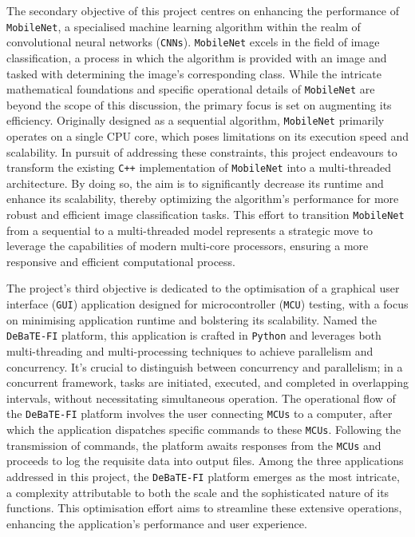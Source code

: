 \documentclass[12pt]{article}
\begin{document}
The secondary objective of this project centres on enhancing the performance of \texttt{MobileNet}, a specialised machine learning algorithm within the realm of convolutional neural networks (\texttt{CNNs}). \texttt{MobileNet} excels in the field of image classification, a process in which the algorithm is provided with an image and tasked with determining the image's corresponding class. While the intricate mathematical foundations and specific operational details of \texttt{MobileNet} are beyond the scope of this discussion, the primary focus is set on augmenting its efficiency. Originally designed as a sequential algorithm, \texttt{MobileNet} primarily operates on a single CPU core, which poses limitations on its execution speed and scalability. In pursuit of addressing these constraints, this project endeavours to transform the existing \texttt{C++} implementation of \texttt{MobileNet} into a multi-threaded architecture. By doing so, the aim is to significantly decrease its runtime and enhance its scalability, thereby optimizing the algorithm's performance for more robust and efficient image classification tasks. This effort to transition \texttt{MobileNet} from a sequential to a multi-threaded model represents a strategic move to leverage the capabilities of modern multi-core processors, ensuring a more responsive and efficient computational process.

The project's third objective is dedicated to the optimisation of a graphical user interface (\texttt{GUI}) application designed for microcontroller (\texttt{MCU}) testing, with a focus on minimising application runtime and bolstering its scalability. Named the \texttt{DeBaTE-FI} platform, this application is crafted in \texttt{Python} and leverages both multi-threading and multi-processing techniques to achieve parallelism and concurrency. It's crucial to distinguish between concurrency and parallelism; in a concurrent framework, tasks are initiated, executed, and completed in overlapping intervals, without necessitating simultaneous operation. The operational flow of the \texttt{DeBaTE-FI} platform involves the user connecting \texttt{MCUs} to a computer, after which the application dispatches specific commands to these \texttt{MCUs}. Following the transmission of commands, the platform awaits responses from the \texttt{MCUs} and proceeds to log the requisite data into output files. Among the three applications addressed in this project, the \texttt{DeBaTE-FI} platform emerges as the most intricate, a complexity attributable to both the scale and the sophisticated nature of its functions. This optimisation effort aims to streamline these extensive operations, enhancing the application's performance and user experience.
\end{document}
